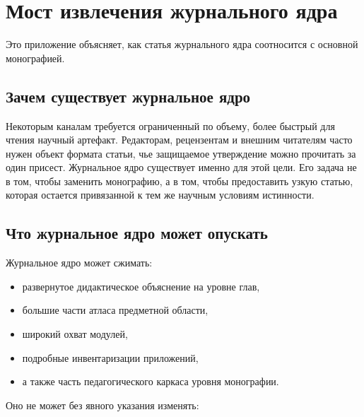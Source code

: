\section{Мост извлечения журнального ядра}

Это приложение объясняет, как статья журнального ядра соотносится с основной монографией.

\subsection{Зачем существует журнальное ядро}

Некоторым каналам требуется ограниченный по объему, более быстрый для чтения научный артефакт.
Редакторам, рецензентам и внешним читателям часто нужен объект формата статьи, чье защищаемое утверждение можно
прочитать за один присест.
Журнальное ядро существует именно для этой цели.
Его задача не в том, чтобы заменить монографию, а в том, чтобы предоставить узкую статью, которая остается привязанной к
тем же научным условиям истинности.

\subsection{Что журнальное ядро может опускать}

Журнальное ядро может сжимать:

\begin{itemize}
\item развернутое дидактическое объяснение на уровне глав,
\item большие части атласа предметной области,
\item широкий охват модулей,
\item подробные инвентаризации приложений,
\item а также часть педагогического каркаса уровня монографии.
\end{itemize}

Оно не может без явного указания изменять:

